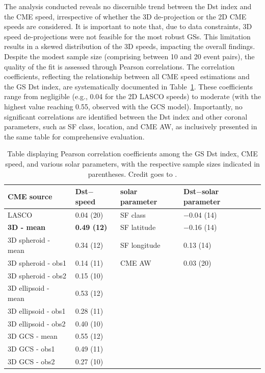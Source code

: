 The analysis conducted reveals no discernible trend between the Dst index and the CME speed, irrespective of whether the 3D de-projection or the 2D CME speeds are considered. It is important to note that, due to data constraints, 3D speed de-projections were not feasible for the most robust GSs. This limitation results in a skewed distribution of the 3D speeds, impacting the overall findings. Despite the modest sample size (comprising between 10 and 20 event pairs), the quality of the fit is assessed through Pearson correlations. The correlation coefficients, reflecting the relationship between all CME speed estimations and the GS Dst index, are systematically documented in Table~\ref{tab_cc_CME}. These coefficients range from negligible (e.g., 0.04 for the 2D LASCO speeds) to moderate (with the highest value reaching 0.55, observed with the GCS model). Importantly, no significant correlations are identified between the Dst index and other coronal parameters, such as SF class, location, and CME AW, as inclusively presented in the same table for comprehensive evaluation.

\begin{table}[!htp] 
	\small
	\centering
	\caption{Table displaying Pearson correlation coefficients among the GS Dst index, CME speed, and various solar parameters, with the respective sample sizes indicated in parentheses. Credit goes to \citet{miteva_2023}.}
	\label{tab_cc_CME}
	\begin{tabular}{llll}
		\toprule
		\textbf{CME source}	& \textbf{Dst$-$speed} & \textbf{solar parameter} & \textbf{Dst$-$solar parameter}	\\
		\midrule
		LASCO              & 0.04 (20) & SF class      & $-$0.04 (14) \\
		{\bf 3D - mean}    & {\bf 0.49 (12)} & SF latitude   & $-$0.16 (14)   \\
		3D spheroid - mean & 0.34 (12) & SF longitude  & 0.13 (14)	\\
		3D spheroid - obs1 & 0.14 (11) & CME AW        & 0.03 (20) \\
		3D spheroid - obs2 & 0.15 (10) & \\ 
		3D ellipsoid - mean & 0.53 (12) & &	\\
		3D ellipsoid - obs1 & 0.28 (11) & & \\
		3D ellipsoid - obs2 & 0.40 (10) & &\\
		3D GCS - mean & 0.55 (12) & &\\
		3D GCS - obs1 & 0.49 (11) & &\\
		3D GCS - obs2 & 0.27 (10) & & \\
		\bottomrule
	\end{tabular}
\end{table}

